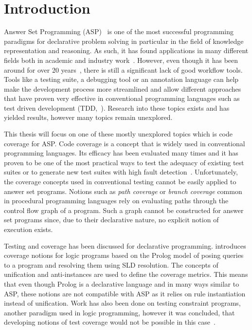 \chapter{Introduction}
\label{ch:Introduction}
Answer Set Programming (ASP)~\cite{Lif19} is one of the most successful programming paradigms for declarative problem solving in particular in the field of knowledge representation and reasoning. As such, it has found applications in many different fields both in academic and industry work~\cite{EGL16}.
However, even though it has been around for over 20 years~\cite{Nie99, MT98}, there is still a significant lack of good workflow tools. Tools like a testing suite, a debugging tool or an annotation language can help make the development process more streamlined and allow different approaches that have proven very effective in conventional programming languages such as test driven development (TDD,~\cite{Fra+03}). Research into these topics exists and has yielded results, however many topics remain unexplored.

This thesis will focus on one of these mostly unexplored topics which is code coverage for ASP. Code coverage is a concept that is widely used in conventional programming languages. Its efficacy has been evaluated many times and it has proven to be one of the most practical ways to test the adequacy of existing test suites or to generate new test suites with high fault detection~\cite{GJG14}.
Unfortunately, the coverage concepts used in conventional testing cannot be easily applied to answer set programs. Notions such as \emph{path coverage} or \emph{branch coverage} common in procedural programming languages rely on evaluating paths through the control flow graph of a program. Such a graph cannot be constructed for answer set programs since, due to their declarative nature, no explicit notion of execution exists.

Testing and coverage has been discussed for declarative programming. \cite{BJ98} introduces coverage notions for logic programs based on the Prolog model of posing queries to a program and resolving them using SLD resolution. The concepts of unification and anti-instances are used to define the coverage metrics. This means that even though Prolog is a declarative language and in many ways similar to ASP, these notions are not compatible with ASP as it relies on rule instantiation instead of unification.
Work has also been done on testing constraint programs, another paradigm used in logic programming, however it was concluded, that developing notions of test coverage would not be possible in this case~\cite{LGL10}.


